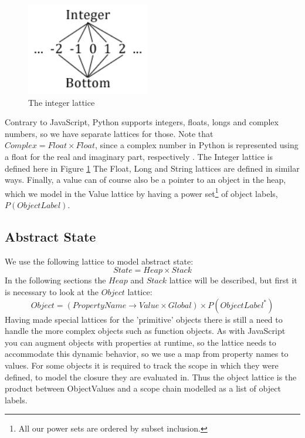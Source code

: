 \begin{figure}
	\vspace{-20pt}
	\begin{center}
		\includegraphics[width=0.48\textwidth]{images/integer-lattice.png}
	\end{center}
	\vspace{-10pt}
	\caption{The integer lattice}
	\label{fig:latticeInteger}
	\vspace{-10pt}
\end{figure}
Contrary to JavaScript, Python supports integers, floats, longs and complex numbers, so we have separate lattices for those. Note that $Complex = Float \times Float$, since a complex number in Python is represented using a float for the real and imaginary part, respectively \cite{pyref.stdtypes}. The Integer lattice is defined here in Figure \ref{fig:latticeInteger} The Float, Long and String lattices are defined in similar ways. Finally, a value can of course also be a pointer to an object in the heap, which we model in the Value lattice by having a power set\footnote{All our power sets are ordered by subset inclusion.} of object labels, $P(ObjectLabel)$.

\subsection{Abstract State}
We use the following lattice to model abstract state:
\begin{equation*}
State = Heap \times Stack
\end{equation*}
In the following sections the $Heap$ and $Stack$ lattice will be described, but first it is necessary to look at the $Object$ lattice:
\begin{equation*}
Object = (PropertyName \rightarrow Value \times Global) \times P(ObjectLabel^{*})
\end{equation*}
Having made special lattices for the 'primitive' objects there is still a need to handle the more complex objects such as function objects.
As with JavaScript you can augment objects with properties at runtime, so the lattice needs to accommodate this dynamic behavior, so
we use a map from property names to values. For some objects it is required to track the scope in which they were defined, to model the closure they are evaluated in.
Thus the object lattice is the product between ObjectValues and a scope chain modelled as a list of object labels.
